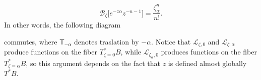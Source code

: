 \documentclass{article}
\newcommand{\maps}{\colon}
\newcommand{\C}{\mathbb{C}}
\newcommand{\laplace}{\mathcal{L}}
\newcommand{\borel}{\mathcal{B}}
\theoremstyle{definition}
\theoremstyle{plain}
\newtheorem{lemma}[definition]{Lemma}
\begin{document}
    \[\borel_{\zeta}\big[e^{-z\alpha}z^{-n-1}\big]=\frac{\zeta_\alpha^n}{n!}.\]
In other words, the following diagram 
    \begin{center}
\end{center}
commutes, where $\mathsf{T}_{-\alpha}$ denotes traslation by $-\alpha$. Notice that $\laplace_{\zeta, 0}$ and $\laplace_{\zeta, \alpha}$ produce functions on the fiber $T^*_{\zeta = 0}B$, while $\laplace_{\zeta_\alpha, 0}$ produces functions on the fiber $T^*_{\zeta = \alpha}B$, so this argument depends on the fact that $z$ is defined almost globally $T^*B$.
\end{document}
